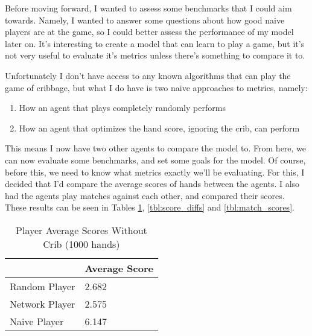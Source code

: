 \documentclass[]{article}
\begin{document}
Before moving forward, I wanted to assess some benchmarks that I could aim towards. Namely, I wanted to answer some questions about how good naive players are at the game, so I could better assess the performance of my model later on. It's interesting to create a model that can learn to play a game, but it's not very useful to evaluate it's metrics unless there's something to compare it to. 

Unfortunately I don't have access to any known algorithms that can play the game of cribbage, but what I do have is two naive approaches to metrics, namely:
\begin{enumerate}
    \item How an agent that plays completely randomly performs
    \item How an agent that optimizes the hand score, ignoring the crib, can perform
\end{enumerate}

This means I now have two other agents to compare the model to. From here, we can now evaluate some benchmarks, and set some goals for the model. Of course, before this, we need to know what metrics exactly we'll be evaluating. For this, I decided that I'd compare the average scores of hands between the agents. I also had the agents play matches against each other, and compared their scores. These results can be seen in Tables \ref{tbl:scores}, \ref{tbl:score_diffs} and \ref{tbl:match_scores}. 

\begin{table}[ht]
    \caption {Player Average Scores Without Crib (1000 hands)} \label{tbl:scores}
    \begin{tabular}{l|l|}
    \cline{2-2}
                                         & Average Score                                        \\ \hline
    \multicolumn{1}{|l|}{Random Player}  & 2.682                                                \\ \hline
    \multicolumn{1}{|l|}{Network Player} & 2.575                                                \\ \hline
    \multicolumn{1}{|l|}{Naive Player}   & 6.147                                                \\ \hline
    \end{tabular}
\end{table}
\end{document}
